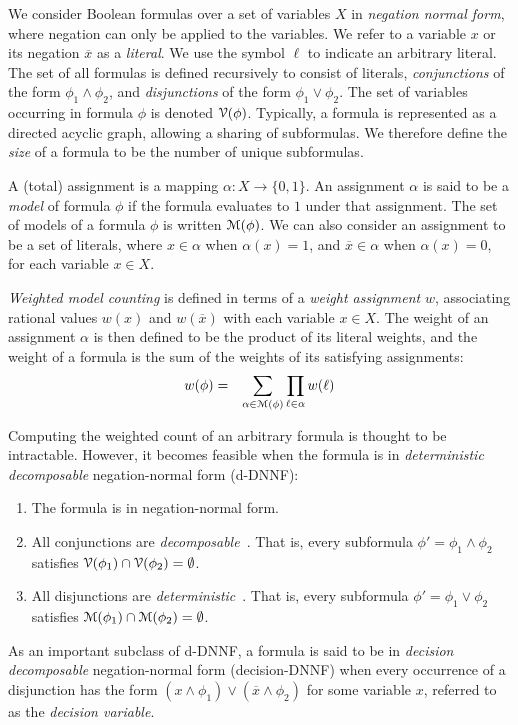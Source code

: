 \documentclass[letterpaper,USenglish,cleveref, autoref, thm-restate]{lipics-v2021}
\newcommand{\obar}[1]{\overline{#1}}
\newcommand{\lit}{\ell}
\newcommand{\varset}{X}
\newcommand{\dependencyset}{{\cal V}}
\newcommand{\assign}{\alpha}
\newcommand{\modelset}{{\cal M}}
\begin{document}
We consider Boolean formulas over a set of variables $\varset$ in
\emph{negation normal form}, where negation can only be applied to the
variables.  We refer to a variable $x$ or its negation $\obar{x}$ as a
\emph{literal}.  We use the symbol $\lit$ to indicate an arbitrary
literal.  The set of all formulas is defined recursively to consist of
literals, \emph{conjunctions} of the form $\phi_1 \land \phi_2$, and
\emph{disjunctions} of the form $\phi_1 \lor \phi_2$.  The set of
variables occurring in formula $\phi$ is denoted
$\dependencyset(\phi)$.  Typically, a formula is represented as a
directed acyclic graph, allowing a sharing of subformulas.  We
therefore define the \emph{size} of a formula to be the number of
unique subformulas.

A (total) assignment is a mapping $\assign \colon \varset \rightarrow
\{0, 1\}$.  An assignment $\assign$ is said to be a \emph{model} of
formula $\phi$ if the formula evaluates to $1$ under that assignment.
The set of models of a formula $\phi$ is written $\modelset(\phi)$.
We can also consider an assignment to be a set of literals, where $x \in \assign$
when $\assign(x) = 1$, and $\obar{x} \in \assign$ when
$\assign(x) = 0$, for each variable $x \in \varset$.

\emph{Weighted model counting} is defined in terms of a \emph{weight
  assignment} $w$, associating rational values $w(x)$ and
$w(\obar{x})$ with each variable $x \in \varset$.
The weight of an
assignment $\assign$ is then defined to be the product of its literal weights, and the weight
of a formula is the sum of the weights of its satisfying assignments:
\begin{eqnarray}
  w(\phi) & = & \sum_{\assign \in \modelset(\phi)} \prod_{\lit \in \assign} w(\lit) \label{eqn:wmc}
\end{eqnarray}

Computing the weighted count of an arbitrary formula is thought to be intractable.  However, it becomes
feasible when the formula is in \emph{deterministic decomposable} negation-normal form (d-DNNF):
\begin{enumerate}
\item The formula is in negation-normal form.  
\item All conjunctions are \emph{decomposable}~\cite{darwiche:jacm:2001,darwiche:jair:2002}.  That is, every subformula $\phi' = \phi_1 \land \phi_2$
  satisfies $\dependencyset(\phi_1) \cap \dependencyset(\phi_2) = \emptyset$.
\item All disjunctions are \emph{deterministic}~\cite{darwiche:jancl:2001,darwiche:jair:2002}.  That is, every subformula $\phi' = \phi_1 \lor \phi_2$ satisfies
  $\modelset(\phi_1) \cap \modelset(\phi_2) = \emptyset$.
\end{enumerate}
As an important subclass of d-DNNF, a formula is said to be in 
\emph{decision decomposable} negation-normal form (decision-DNNF) when every occurrence of a disjunction has the form 
$(x \land \phi_1) \lor (\obar{x} \land \phi_2)$ for some variable $x$, referred to as the \emph{decision variable}.
\end{document}
